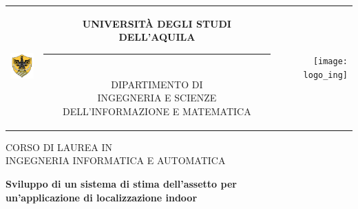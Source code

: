 \begin{titlepage}

\begin{center}
\normalsize

\begin{center}
\begin{tabular}[t]{@{} l @{} c @{} r @{}}
\parbox[c]{0.15\textwidth}{\raggedright \includegraphics[width=0.60in]{logo_univ}}
&
\parbox[c]{0.7\textwidth}
{
\centering \bfseries
UNIVERSITÀ DEGLI STUDI DELL'AQUILA \\[-5pt]
\rule{0.65\textwidth}{1pt} \\
{\scshape DIPARTIMENTO DI \\ INGEGNERIA E SCIENZE DELL'INFORMAZIONE E MATEMATICA }
}
&
\parbox[c]{0.15\textwidth}{\raggedleft \texttt{[image: logo\_ing]}}
\end{tabular}
\end{center}

\bigskip \bigskip



\bigskip \bigskip

{\small CORSO DI LAUREA IN} \\
INGEGNERIA INFORMATICA E AUTOMATICA

\vfil \vfil \vfil

{\bfseries \large
Sviluppo di un sistema di stima dell'assetto  
per \\ un'applicazione di localizzazione indoor\\
}

\vfil \vfil \vfil

\end{center}
\end{titlepage}
